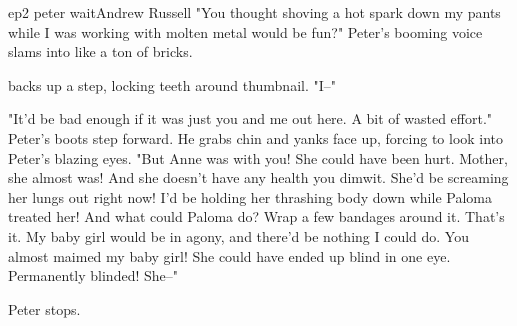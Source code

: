 \documentclass{book}
\begin{document}
\begin{childnode}{ep2 peter wait}{Andrew Russell}
    "You thought shoving a hot spark down my pants while I was working with molten metal would be fun?" Peter's booming voice slams into \name{} like a ton of bricks. 

    \name{} backs up a step, locking \hisher{} teeth around \hisher{} thumbnail. "I--"

    "It'd be bad enough if it was just you and me out here. A bit of wasted effort." Peter's boots step forward. He grabs \names{} chin and yanks \hisher{} face up, forcing \himher{} to look into 
    Peter's blazing eyes. "But Anne was with you! She could have been hurt. 
    Mother, she almost was! And she doesn't have any health you dimwit. She'd be screaming her lungs out right now! I'd be holding her thrashing body down while Paloma treated her! And what could Paloma do? Wrap a few bandages around it. That's it. My baby girl would 
    be in agony, and there'd be nothing I could do. You almost maimed my baby girl! She could have ended up blind in one eye. Permanently blinded! She--"
    
    Peter stops. 



\end{childnode}
\end{document}
